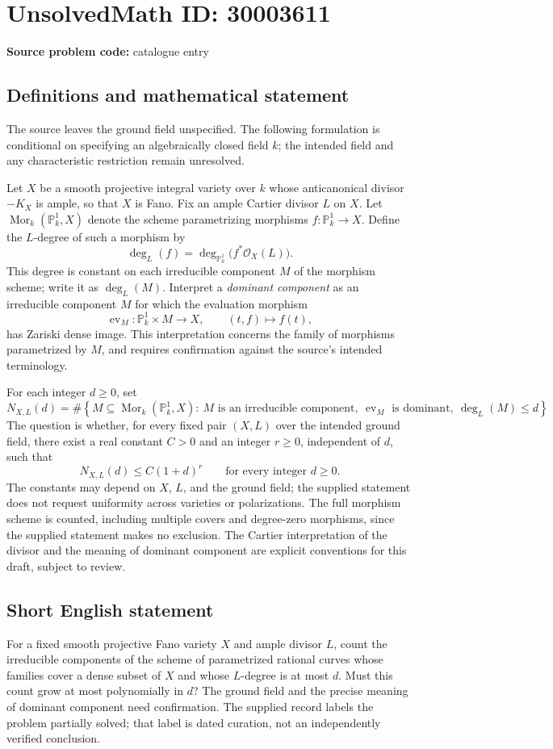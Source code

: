 \documentclass[11pt]{article}
\newcommand{\PP}{\mathbb{P}}
\begin{document}
\section*{UnsolvedMath ID: 30003611}
\textbf{Source problem code:} catalogue entry
\subsection{Definitions and mathematical statement}
The source leaves the ground field unspecified. The following formulation is conditional on specifying an algebraically closed field \(k\); the intended field and any characteristic restriction remain unresolved.

Let \(X\) be a smooth projective integral variety over \(k\) whose anticanonical divisor \(-K_X\) is ample, so that \(X\) is Fano. Fix an ample Cartier divisor \(L\) on \(X\). Let \(\operatorname{Mor}_k(\PP^1_k,X)\) denote the scheme parametrizing morphisms \(f\colon\PP^1_k\to X\). Define the \(L\)-degree of such a morphism by
\[
\deg_L(f)=\deg_{\PP^1_k}\bigl(f^*\mathcal O_X(L)\bigr).
\]
This degree is constant on each irreducible component \(M\) of the morphism scheme; write it as \(\deg_L(M)\). Interpret a \emph{dominant component} as an irreducible component \(M\) for which the evaluation morphism
\[
\operatorname{ev}_M\colon\PP^1_k\times M\longrightarrow X,
\qquad (t,f)\longmapsto f(t),
\]
has Zariski dense image. This interpretation concerns the family of morphisms parametrized by \(M\), and requires confirmation against the source's intended terminology.

For each integer \(d\geq 0\), set
\[
N_{X,L}(d)=\#\left\{M\subseteq\operatorname{Mor}_k(\PP^1_k,X):\ M\text{ is an irreducible component},\ \operatorname{ev}_M\text{ is dominant},\ \deg_L(M)\leq d\right\}.
\]
The question is whether, for every fixed pair \((X,L)\) over the intended ground field, there exist a real constant \(C>0\) and an integer \(r\geq 0\), independent of \(d\), such that
\[
N_{X,L}(d)\leq C(1+d)^r
\qquad\text{for every integer }d\geq 0.
\]
The constants may depend on \(X\), \(L\), and the ground field; the supplied statement does not request uniformity across varieties or polarizations. The full morphism scheme is counted, including multiple covers and degree-zero morphisms, since the supplied statement makes no exclusion. The Cartier interpretation of the divisor and the meaning of dominant component are explicit conventions for this draft, subject to review.
\subsection{Short English statement}
For a fixed smooth projective Fano variety \(X\) and ample divisor \(L\), count the irreducible components of the scheme of parametrized rational curves whose families cover a dense subset of \(X\) and whose \(L\)-degree is at most \(d\). Must this count grow at most polynomially in \(d\)? The ground field and the precise meaning of dominant component need confirmation. The supplied record labels the problem partially solved; that label is dated curation, not an independently verified conclusion.
\end{document}
